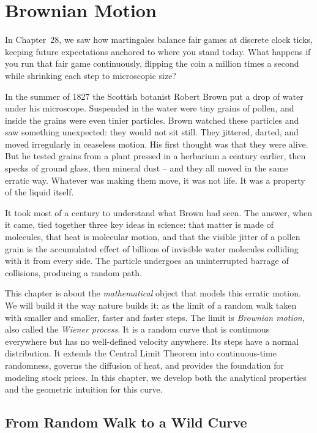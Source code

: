 \chapter{Brownian Motion}

In Chapter~28, we saw how martingales balance fair games at discrete clock
ticks, keeping future expectations anchored to where you stand today. What happens
if you run that fair game continuously, flipping the coin a million times a second
while shrinking each step to microscopic size?

In the summer of 1827 the Scottish botanist Robert Brown put a drop of water
under his microscope. Suspended in the water were tiny grains of pollen, and
inside the grains were even tinier particles. Brown watched these particles and
saw something unexpected: they would not sit still. They jittered, darted,
and moved irregularly in ceaseless motion. His first thought was that they
were alive. But he tested grains from a plant pressed in a herbarium a century
earlier, then specks of ground glass, then mineral dust -- and
they all moved in the same erratic way. Whatever was making them move, it was not life. It was
a property of the liquid itself.

It took most of a century to understand what Brown had seen. The answer, when it
came, tied together three key ideas in science: that matter is made of
molecules, that heat is molecular motion, and that the visible jitter of a pollen
grain is the accumulated effect of billions of invisible water molecules colliding
with it from every side. The particle undergoes an uninterrupted barrage of collisions,
producing a random path.

This chapter is about the \emph{mathematical} object that models this erratic motion. We
will build it the way nature builds it: as the limit of a random walk taken with
smaller and smaller, faster and faster steps. The limit is
\emph{Brownian motion}, also called the \emph{Wiener process}.
It is a random curve that is continuous everywhere but has no well-defined velocity anywhere.
Its steps have a normal distribution. It extends the Central Limit Theorem into continuous-time
randomness, governs the diffusion of heat, and provides the foundation for modeling stock prices.
In this chapter, we develop both the analytical properties and the geometric intuition for this curve.

\chapterline

\section{From Random Walk to a Wild Curve}
\label{ch29:walk-to-curve}

